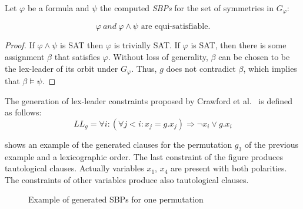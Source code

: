 \begin{theorem}
 \label{theorem:satisfiability_preservation_SBPs}
 Let $\varphi$ be a formula and $\psi$ the computed \textit{SBPs} for the set of symmetries in $G_{\varphi}$:
 
 $$\varphi~and ~\varphi \wedge \psi \text{ are equi-satisfiable}.$$
\end{theorem}
\begin{proof}
 If $\varphi \wedge \psi$ is SAT then $\varphi$ is trivially SAT. If
 $\varphi$ is SAT, then there is some assignment $\beta$ that satisfies $\varphi$.
 Without loss of generality, $\beta$ can be chosen to be the lex-leader of its
 orbit under $G_{\varphi}$. Thus, $g$ does not contradict $\beta$, which implies that
 $\beta \models \psi$.
\end{proof}



%
%
%

The generation of lex-leader constraints proposed by Crawford et al.~\cite{crawford1996symmetry} is defined as follows:
$$ LL_g = \forall i : (\forall j < i : x_j = g.x_j) \Rightarrow  \neg x_i \lor g.x_i$$
 
  shows an example of the generated clauses for the  permutation $g_3$ of the previous 
 example and a lexicographic order. The last constraint of the figure produces tautological clauses.
 Actually variables $x_1$, $x_4$ are present with both polarities. The constraints of other variables produce 
 also tautological clauses. 
 
 \begin{figure}[!htbp]
  
  \caption{Example of generated SBPs for one permutation}
  \label{fig:esbp_gen}
 \end{figure}

